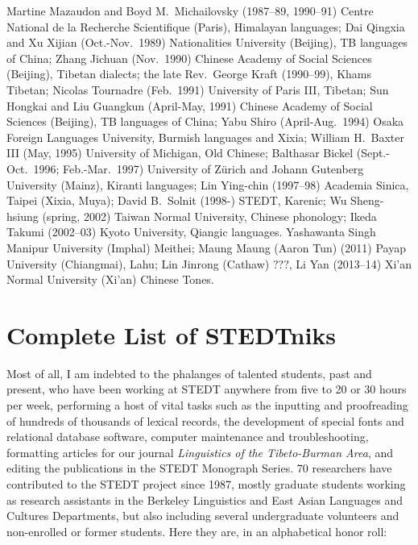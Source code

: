 Martine Mazaudon and Boyd M.\ Michailovsky (1987–89, 1990–91) Centre National de la Recherche Scientifique (Paris), Himalayan languages; {\sc Dai} Qingxia and {\sc Xu} Xijian (Oct.-Nov.\ 1989) Nationalities University (Beijing), TB languages of China; {\sc Zhang} Jichuan (Nov.\ 1990) Chinese Academy of Social Sciences (Beijing), Tibetan dialects; the late Rev.\ George Kraft (1990–99), Khams Tibetan; Nicolas Tournadre (Feb.\ 1991) University of Paris III, Tibetan; {\sc Sun} Hongkai and {\sc Liu} Guangkun (April-May, 1991) Chinese Academy of Social Sciences (Beijing), TB languages of China; {\sc Yabu} Shiro (April-Aug.\ 1994) Osaka Foreign Languages University, Burmish languages and Xixia; William H.\ Baxter III (May, 1995) University of Michigan, Old Chinese; Balthasar Bickel (Sept.-Oct.\ 1996; Feb.-Mar.\ 1997) University of Z\"urich and Johann Gutenberg University (Mainz), Kiranti languages; {\sc Lin} Ying-chin (1997–98) Academia Sinica, Taipei (Xixia, Muya); David B.\ Solnit (1998-) STEDT, Karenic; {\sc Wu} Sheng-hsiung (spring, 2002) Taiwan Normal University, Chinese phonology; {\sc Ikeda} Takumi (2002–03) Kyoto University, Qiangic languages. Yashawanta Singh  Manipur University (Imphal) Meithei; Maung Maung (Aaron Tun) (2011) Payap University (Chiangmai), Lahu; Lin Jinrong (Cathaw) ???, Li Yan (2013–14) Xi'an Normal University (Xi'an) Chinese Tones.

\section{Complete List of STEDTniks}

Most of all, I am indebted to the phalanges of talented students, past and present, who have been working at STEDT anywhere from five to 20 or 30 hours per week, performing a host of vital tasks such as the inputting and proofreading of hundreds of thousands of lexical records, the development of special fonts and relational database software, computer maintenance and troubleshooting, formatting articles for our journal {\it Linguistics of the Tibeto-Burman Area}, and editing the publications in the STEDT Monograph Series. 70 researchers have contributed to the STEDT project since 1987, mostly graduate students working as research assistants in the Berkeley Linguistics and East Asian Languages and Cultures Departments, but also including several undergraduate volunteers and non-enrolled or former students. Here they are, in an alphabetical honor roll:

